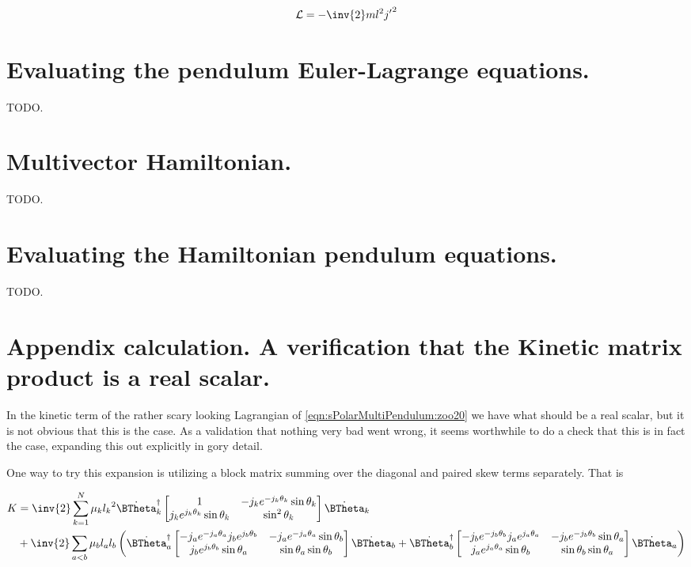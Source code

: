 \begin{align}\label{eqn:sPolarMultiPendulum:noo1}
\LL = -\inv{2} m l^2 {j'}^2
\end{align}

\section{Evaluating the pendulum Euler-Lagrange equations.}

TODO.

\section{Multivector Hamiltonian.}

TODO.

\section{Evaluating the Hamiltonian pendulum equations.}

TODO.

\section{Appendix calculation.  A verification that the Kinetic matrix product is a real scalar.}

In the kinetic term of the rather scary looking Lagrangian of \ref{eqn:sPolarMultiPendulum:zoo20} we have what should be a real scalar, but it is not obvious that this is the case.  As a validation that nothing very bad went wrong, it seems worthwhile to do a check that this is in fact the case, expanding this out explicitly in gory detail.

One way to try this expansion is utilizing a block matrix summing over the diagonal and paired skew terms separately.  That is

\begin{align*}
K &=
\inv{2}
\sum_{k=1}^N
\mu_k
{l_k}^2
{\dot{\BTheta}_k}^\dagger
\begin{bmatrix}
1 & - j_k e^{-j_k \theta_k} \sin\theta_k \\
j_k e^{j_k \theta_k} \sin\theta_k & \sin^2\theta_k 
\end{bmatrix}
\dot{\BTheta}_k \\
&+
\inv{2}
\sum_{a<b}
\mu_b
l_a l_b
\left(
{\dot{\BTheta}_a}^\dagger
\begin{bmatrix}
- j_a e^{-j_a \theta_a} j_b e^{j_b\theta_b} & - j_a e^{-j_a \theta_a} \sin\theta_b \\
j_b e^{j_b \theta_b} \sin\theta_a & \sin\theta_a \sin\theta_b
\end{bmatrix}
\dot{\BTheta}_b 
+
{\dot{\BTheta}_b}^\dagger
\begin{bmatrix}
- j_b e^{-j_b \theta_b} j_a e^{j_a\theta_a} & - j_b e^{-j_b \theta_b} \sin\theta_a \\
j_a e^{j_a \theta_a} \sin\theta_b & \sin\theta_b \sin\theta_a
\end{bmatrix}
\dot{\BTheta}_a
\right)
\end{align*}

